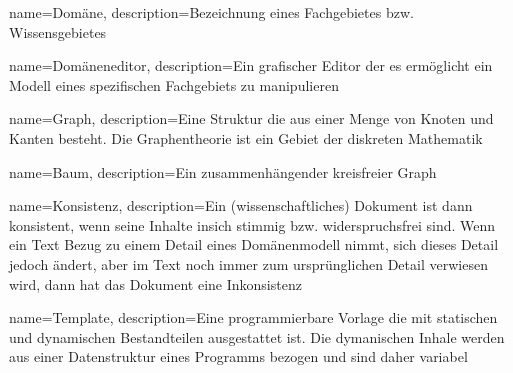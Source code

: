 {
  name=Domäne,
  description={Bezeichnung eines Fachgebietes bzw. Wissensgebietes}
}

{
  name=Domäneneditor,
  description={Ein grafischer Editor der es ermöglicht ein Modell eines spezifischen Fachgebiets zu manipulieren}
}

{
  name=Graph,
  description={Eine Struktur die aus einer Menge von Knoten und Kanten besteht. Die Graphentheorie ist ein Gebiet der diskreten Mathematik}
}

{
  name=Baum,
  description={Ein zusammenhängender kreisfreier Graph}
}

{
  name=Konsistenz,
  description={Ein (wissenschaftliches) Dokument ist dann konsistent, wenn seine Inhalte insich stimmig bzw. widerspruchsfrei sind. Wenn ein Text Bezug zu einem Detail eines Domänenmodell nimmt, sich dieses Detail jedoch ändert, aber im Text noch immer zum ursprünglichen Detail verwiesen wird, dann hat das Dokument eine Inkonsistenz}
}

{
  name=Template,
  description={Eine programmierbare Vorlage die mit statischen und dynamischen Bestandteilen ausgestattet ist. Die dymanischen Inhale werden aus einer Datenstruktur eines Programms bezogen und sind daher variabel}
}




